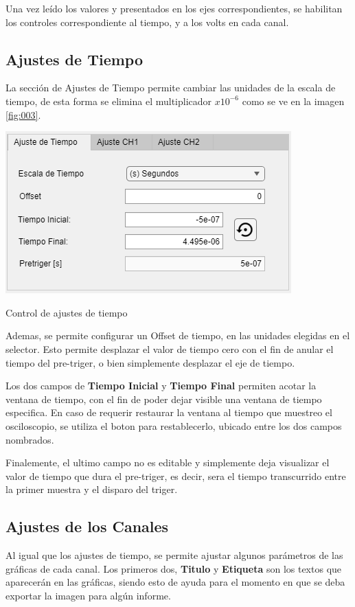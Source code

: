 Una vez leído los valores y presentados en los ejes correspondientes, se habilitan los controles correspondiente al tiempo, y a los volts en cada canal.



\subsection{Ajustes de Tiempo}
La sección de Ajustes de Tiempo permite cambiar las unidades de la escala de tiempo, de esta forma se elimina el multiplicador $x10^{-6}$ como se ve en la imagen \ref{fig:003}.

\begin{center}
	\includegraphics[width=0.4\columnwidth]{images/Ajuste_Tiempo}
	\captionsetup{type=figure}
	\caption{Control de ajustes de tiempo}
	\label{fig:004}
\end{center}

Ademas, se permite configurar un Offset de tiempo, en las unidades elegidas en el selector. Esto permite desplazar el valor de tiempo cero con el fin de anular el tiempo del pre-triger, o bien simplemente desplazar el eje de tiempo.

Los dos campos de \textbf{Tiempo Inicial} y \textbf{Tiempo Final} permiten acotar la ventana de tiempo, con el fin de poder dejar visible una ventana de tiempo especifica. En caso de requerir restaurar la ventana al tiempo que muestreo el osciloscopio, se utiliza el boton para restablecerlo, ubicado entre los dos campos nombrados.

Finalemente, el ultimo campo no es editable y simplemente deja visualizar el valor de tiempo que dura el pre-triger, es decir, sera el tiempo transcurrido entre la primer muestra y el disparo del triger.


\subsection{Ajustes de los Canales}

Al igual que los ajustes de tiempo, se permite ajustar algunos parámetros de las gráficas de cada canal. Los primeros dos, \textbf{Titulo} y \textbf{Etiqueta} son los textos que aparecerán en las gráficas, siendo esto de ayuda para el momento en que se deba exportar la imagen para algún informe.

